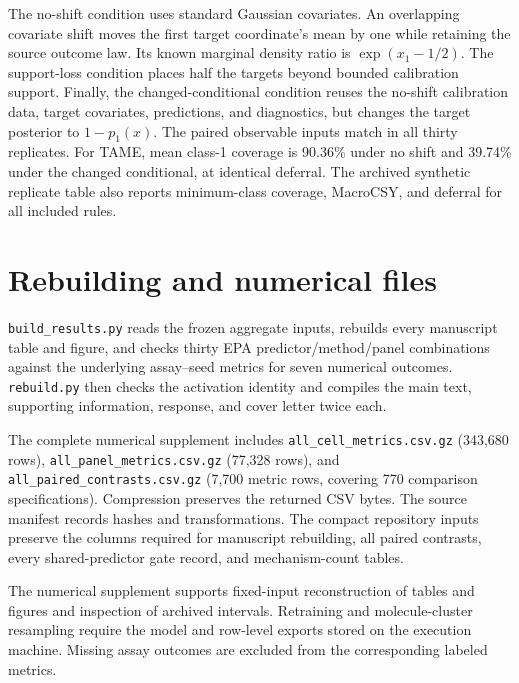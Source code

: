 The no-shift condition uses standard Gaussian covariates. An overlapping covariate shift moves the first target coordinate's mean by one while retaining the source outcome law. Its known marginal density ratio is $\exp(x_1-1/2)$. The support-loss condition places half the targets beyond bounded calibration support. Finally, the changed-conditional condition reuses the no-shift calibration data, target covariates, predictions, and diagnostics, but changes the target posterior to $1-p_1(x)$. The paired observable inputs match in all thirty replicates. For TAME, mean class-1 coverage is 90.36\% under no shift and 39.74\% under the changed conditional, at identical deferral. The archived synthetic replicate table also reports minimum-class coverage, MacroCSY, and deferral for all included rules.

\section{Rebuilding and numerical files}
\texttt{build\_results.py} reads the frozen aggregate inputs, rebuilds every manuscript table and figure, and checks thirty EPA predictor/method/panel combinations against the underlying assay--seed metrics for seven numerical outcomes. \texttt{rebuild.py} then checks the activation identity and compiles the main text, supporting information, response, and cover letter twice each.

The complete numerical supplement includes \texttt{all\_cell\_metrics.csv.gz} (343,680 rows), \texttt{all\_panel\_metrics.csv.gz} (77,328 rows), and \texttt{all\_paired\_contrasts.csv.gz} (7,700 metric rows, covering 770 comparison specifications). Compression preserves the returned CSV bytes. The source manifest records hashes and transformations. The compact repository inputs preserve the columns required for manuscript rebuilding, all paired contrasts, every shared-predictor gate record, and mechanism-count tables.

The numerical supplement supports fixed-input reconstruction of tables and figures and inspection of archived intervals. Retraining and molecule-cluster resampling require the model and row-level exports stored on the execution machine. Missing assay outcomes are excluded from the corresponding labeled metrics.
\begingroup\small\endgroup

